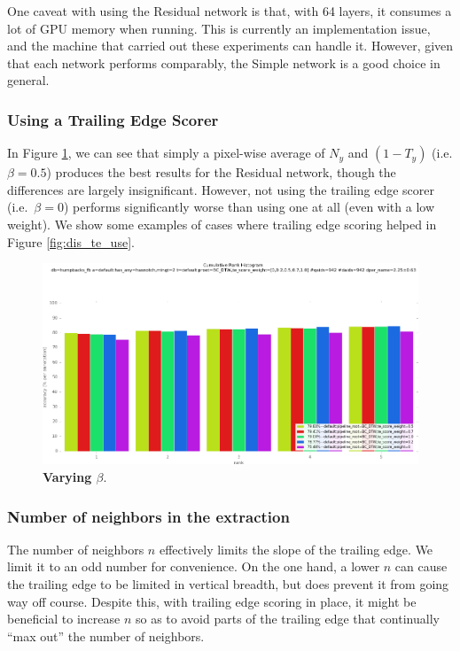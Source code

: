 One caveat with using the Residual network is that, with 64 layers, it consumes a lot of GPU memory when running.
This is currently an implementation issue, and the machine that carried out these experiments can handle it.
However, given that each network performs comparably, the Simple network is a good choice in general.

\subsubsection{Using a Trailing Edge Scorer}

In Figure \ref{fig:vary_te_weight}, we can see that simply a pixel-wise average of $N_y$ and $(1-T_y)$ (i.e. $\beta = 0.5$) produces the best results for the Residual network, though the differences are largely insignificant.
However, not using the trailing edge scorer (i.e.\ $\beta = 0$) performs significantly worse than using one at all (even with a low weight).
We show some examples of cases where trailing edge scoring helped in Figure \ref{fig:dis_te_use}.

\begin{figure}[t]%
\centering
\includegraphics[width=1\textwidth]{../images/results/vary_te_weight.png}
\caption{\textbf{Varying $\beta$}.}
\label{fig:vary_te_weight}
\end{figure}


\subsubsection{Number of neighbors in the extraction}

The number of neighbors $n$ effectively limits the slope of the trailing edge.
We limit it to an odd number for convenience.
On the one hand, a lower $n$ can cause the trailing edge to be limited in vertical breadth, but does prevent it from going way off course.
Despite this, with trailing edge scoring in place, it might be beneficial to increase $n$ so as to avoid parts of the trailing edge that continually ``max out'' the number of neighbors.

